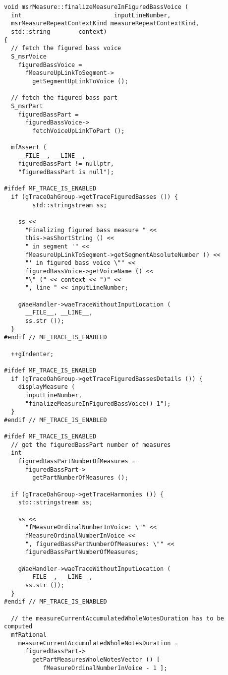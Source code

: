 \begin{lstlisting}[language=CPlusPlus]
void msrMeasure::finalizeMeasureInFiguredBassVoice (
  int                          inputLineNumber,
  msrMeasureRepeatContextKind measureRepeatContextKind,
  std::string        context)
{
  // fetch the figured bass voice
  S_msrVoice
    figuredBassVoice =
      fMeasureUpLinkToSegment->
        getSegmentUpLinkToVoice ();

  // fetch the figured bass part
  S_msrPart
    figuredBassPart =
      figuredBassVoice->
        fetchVoiceUpLinkToPart ();

  mfAssert (
    __FILE__, __LINE__,
    figuredBassPart != nullptr,
    "figuredBassPart is null");

#ifdef MF_TRACE_IS_ENABLED
  if (gTraceOahGroup->getTraceFiguredBasses ()) {
		std::stringstream ss;

    ss <<
      "Finalizing figured bass measure " <<
      this->asShortString () <<
      " in segment '" <<
      fMeasureUpLinkToSegment->getSegmentAbsoluteNumber () <<
      "' in figured bass voice \"" <<
      figuredBassVoice->getVoiceName () <<
      "\" (" << context << ")" <<
      ", line " << inputLineNumber;

    gWaeHandler->waeTraceWithoutInputLocation (
      __FILE__, __LINE__,
      ss.str ());
  }
#endif // MF_TRACE_IS_ENABLED

  ++gIndenter;

#ifdef MF_TRACE_IS_ENABLED
  if (gTraceOahGroup->getTraceFiguredBassesDetails ()) {
    displayMeasure (
      inputLineNumber,
      "finalizeMeasureInFiguredBassVoice() 1");
  }
#endif // MF_TRACE_IS_ENABLED

#ifdef MF_TRACE_IS_ENABLED
  // get the figuredBassPart number of measures
  int
    figuredBassPartNumberOfMeasures =
      figuredBassPart->
        getPartNumberOfMeasures ();

  if (gTraceOahGroup->getTraceHarmonies ()) {
    std::stringstream ss;

    ss <<
      "fMeasureOrdinalNumberInVoice: \"" <<
      fMeasureOrdinalNumberInVoice <<
      ", figuredBassPartNumberOfMeasures: \"" <<
      figuredBassPartNumberOfMeasures;

    gWaeHandler->waeTraceWithoutInputLocation (
      __FILE__, __LINE__,
      ss.str ());
  }
#endif // MF_TRACE_IS_ENABLED

  // the measureCurrentAccumulatedWholeNotesDuration has to be computed
  mfRational
    measureCurrentAccumulatedWholeNotesDuration =
      figuredBassPart->
        getPartMeasuresWholeNotesVector () [
           fMeasureOrdinalNumberInVoice - 1 ];


\end{lstlisting}
